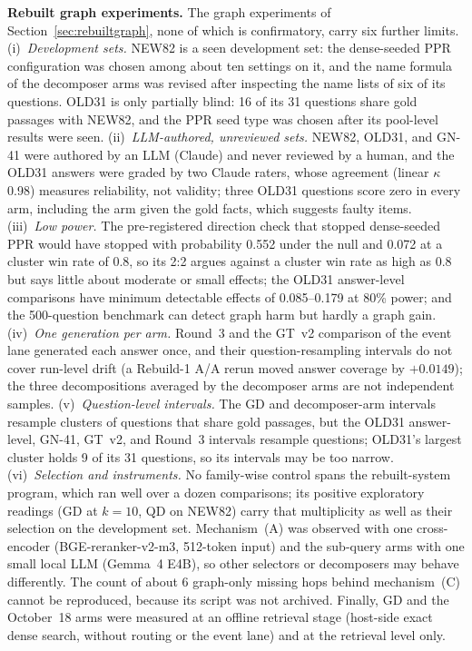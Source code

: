 \textbf{Rebuilt graph experiments.} The graph experiments of
Section~\ref{sec:rebuiltgraph}, none of which is confirmatory, carry
six further limits. (i)~\emph{Development sets.} NEW82 is a seen
development set: the dense-seeded PPR configuration was chosen among
about ten settings on it, and the name formula of the decomposer arms
was revised after inspecting the name lists of six of its questions.
OLD31 is only partially blind: 16 of its 31 questions share gold
passages with NEW82, and the PPR seed type was chosen after its
pool-level results were seen. (ii)~\emph{LLM-authored, unreviewed
sets.} NEW82, OLD31, and GN-41 were authored by an LLM (Claude) and
never reviewed by a human, and the OLD31 answers were graded by two
Claude raters, whose agreement (linear $\kappa$ 0.98) measures
reliability, not validity; three OLD31 questions score zero in every
arm, including the arm given the gold facts, which suggests faulty
items. (iii)~\emph{Low power.} The pre-registered direction check that
stopped dense-seeded PPR would have stopped with probability 0.552
under the null and 0.072 at a cluster win rate of 0.8, so its 2:2
argues against a cluster win rate as high as 0.8 but says little about
moderate or small effects; the OLD31 answer-level comparisons have minimum detectable effects
of 0.085--0.179 at 80\% power; and the 500-question benchmark can
detect graph harm but hardly a graph gain. (iv)~\emph{One generation
per arm.} Round~3 and the GT~v2 comparison of the event lane generated
each answer once, and their question-resampling intervals do not cover
run-level drift (a Rebuild-1 A/A rerun moved answer coverage by
$+0.0149$); the three decompositions averaged by the decomposer arms
are not independent samples. (v)~\emph{Question-level intervals.} The
GD and decomposer-arm intervals resample clusters of questions that
share gold passages, but the OLD31 answer-level, GN-41, GT~v2, and
Round~3 intervals resample questions; OLD31's largest
cluster holds 9 of its 31 questions, so its intervals may be too
narrow. (vi)~\emph{Selection and instruments.} No family-wise control
spans the rebuilt-system program, which ran well over a dozen
comparisons; its positive exploratory readings (GD at $k=10$, QD on
NEW82) carry that multiplicity as well as their selection on the
development set. Mechanism~(A) was observed with one cross-encoder
(BGE-reranker-v2-m3, 512-token input) and the sub-query arms with one
small local LLM (Gemma~4 E4B), so other selectors or decomposers may
behave differently. The count of about 6 graph-only missing hops behind
mechanism~(C) cannot be reproduced, because its script was not
archived. Finally, GD and the October~18 arms were measured at an offline
retrieval stage (host-side exact dense search, without routing or the
event lane) and at the retrieval level only.

